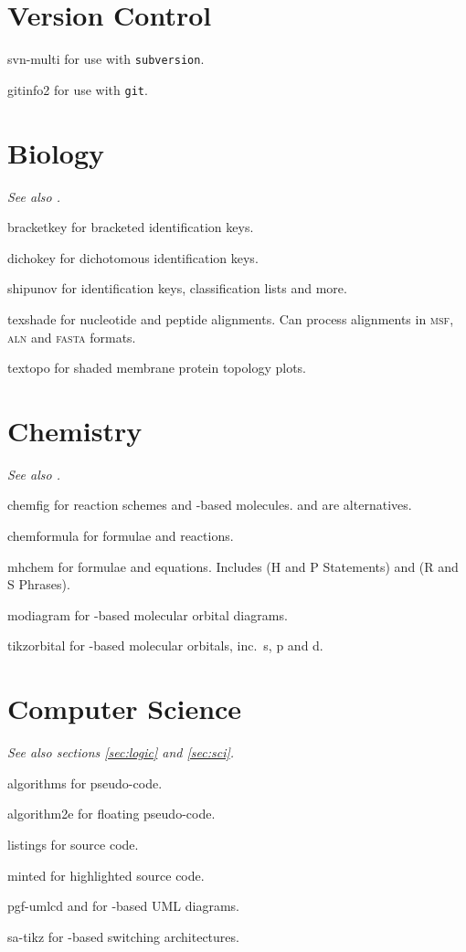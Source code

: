 \documentclass[a4paper,welsh,british,twocolumn]{article}
\begin{document}
\section{Version Control}
\begin{pkgdescription}
  \item[svn-multi] for use with \verb|subversion|.
  \item[gitinfo2] for use with \verb|git|.
\end{pkgdescription}
\appendix
\newcommand*\seesci{\emph{See also .}}
\section{Biology}
\seesci
\begin{pkgdescription}
  \item[bracketkey] for bracketed identification keys.
  \item[dichokey] for dichotomous identification keys.
  \item[shipunov] for identification keys, classification lists and more.
  \item[texshade] for nucleotide and peptide alignments.
  Can process alignments in \textsc{msf}, \textsc{aln} and \textsc{fasta} formats.
  \item[textopo] for shaded membrane protein topology plots.
\end{pkgdescription}
\section{Chemistry}
\seesci
\begin{pkgdescription}
  \item[chemfig] for reaction schemes and -based molecules.
   and  are alternatives.
  \item[chemformula] for formulae and reactions.
  \item[mhchem] for formulae and equations.
  Includes  (H and P Statements) and  (R and S Phrases).
  \item[modiagram] for -based molecular orbital diagrams.
  \item[tikzorbital] for -based molecular orbitals, inc.\ s, p and d.
\end{pkgdescription}
\section{Computer Science}
\emph{See also sections \ref{sec:logic} and \ref{sec:sci}.}
\begin{pkgdescription}
  \item[algorithms] for pseudo-code.
  \item[algorithm2e] for floating pseudo-code.
  \item[listings] for source code.
  \item[minted] for highlighted source code.
  \item[pgf-umlcd] and  for -based UML diagrams.
  \item[sa-tikz] for -based switching architectures.
\end{pkgdescription}
\end{document}
